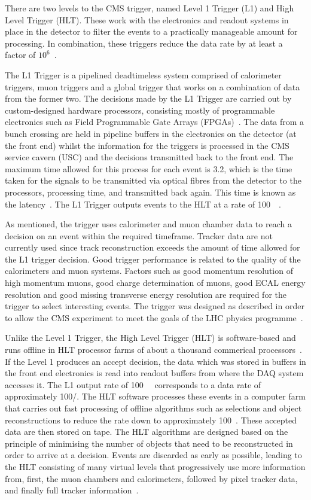 There are two levels to the CMS trigger, named Level 1 Trigger (L1) and High Level Trigger (HLT). These work
with the electronics and readout systems in place in the detector to filter the events to a practically
manageable amount for processing. In combination, these triggers reduce the data rate by at least a factor of
$10^{6}$~\cite{CMS_experiment}.

The L1 Trigger is a pipelined deadtimeless system comprised of calorimeter triggers, muon triggers and a
global trigger that works on a combination of data from the former two. The decisions made by the L1 Trigger
are carried out by custom-designed hardware processors, consisting mostly of programmable electronics such
as Field Programmable Gate Arrays (FPGAs)~\cite{1742-6596-219-3-032009}. The data from a bunch crossing are held in
pipeline buffers in the electronics on the detector (at the front end) whilst the information for the triggers
is processed in the CMS service cavern (USC) and the decisions transmitted back to the front end. The maximum
time allowed for this process for each event is 3.2\us, which is the time taken for the signals to be
transmitted via optical fibres from the detector to the processors, processing time, and transmitted back
again. This time is known as the latency~\cite{CMS_TDR1}. The L1 Trigger outputs events to the HLT at a rate
of 100~\kHz~\cite{CMS_experiment}.

As mentioned, the trigger uses calorimeter and muon chamber data to reach a decision on an event
within the required timeframe. Tracker data are not currently used since track reconstruction exceeds the
amount of time allowed for the L1 trigger decision. Good trigger performance is related to the quality of the
calorimeters and muon systems. Factors such as good momentum resolution of high momentum muons, good charge
determination of muons, good ECAL energy resolution and good missing transverse energy resolution are required
for the trigger to select interesting events. The trigger was designed as described in order to allow the CMS
experiment to meet the goals of the LHC physics programme~\cite{CMS_experiment}.

Unlike the Level 1 Trigger, the High Level Trigger (HLT) is software-based and runs offline in HLT processor
farms of about a thousand commerical processors~\cite{CMS_TDR1}. If the Level 1 produces an accept decision,
the data which was stored in buffers in the front end electronics is read into readout buffers from where the
DAQ system accesses it. The L1 output rate of 100~\kHz~ corresponds to a data rate of approximately 100\GB/\s.
The HLT software processes these events in a computer farm that carries out fast processing of offline
algorithms such as selections and object reconstructions to reduce the rate down to approximately 100~\Hz.
These accepted data are then stored on tape. The HLT algorithms are designed based on the principle of
minimising the number of objects that need to be reconstructed in order to arrive at a decision. Events are
discarded as early as possible, leading to the HLT consisting of many virtual levels that progressively use
more information from, first, the muon chambers and calorimeters, followed by pixel tracker data, and finally
full tracker information~\cite{CMS_TDR1}.

